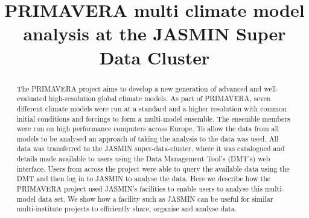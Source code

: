 \documentclass[gmd, manuscript]{copernicus}
\begin{document}
\title{PRIMAVERA multi climate model analysis at the JASMIN Super Data Cluster}













\received{}
\pubdiscuss{} %
\revised{}
\accepted{}
\published{}




\maketitle



\begin{abstract}
The PRIMAVERA project aims to develop a new generation of advanced and well-evaluated high-resolution global climate models. As part of PRIMAVERA, seven different climate models were run at a standard and a higher resolution with common initial conditions and forcings to form a multi-model ensemble. The ensemble members were run on high performance computers across Europe. To allow the data from all models to be analysed an approach of taking the analysis to the data was used. All data was transferred to the JASMIN super-data-cluster, where it was catalogued and details made available to users using the Data Management Tool's (DMT's) web interface. Users from across the project were able to query the available data using the DMT and then log in to JASMIN to analyse the data. Here we describe how the PRIMAVERA project used JASMIN's facilities to enable users to analyse this multi-model data set. We show how a facility such as JASMIN can be useful for similar multi-institute projects to efficiently share, organise and analyse data.
\end{abstract}
\end{document}
